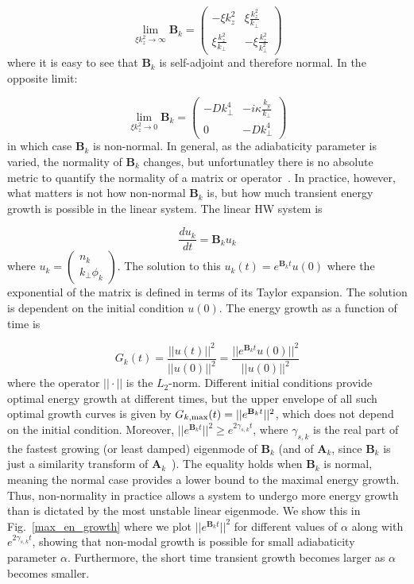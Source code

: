 \documentclass[letter,scriptaddress,twocolumn, prl,showkeys]{revtex4}
\def\beq{\begin{equation}}
\def\eeq{\end{equation}}
\newcommand{\diff}[2]{\frac{d#1}{d#2}}
\begin{document}
\beq
\label{B_norm_limit}
\displaystyle\lim_{\xi k_z^2 \to \infty} \mathbf{B}_k = \left( \begin{array}{cc} -\xi k_z^2 & \xi \frac{k_z^2}{k_\perp} \\  \xi \frac{k_z^2}{k_\perp} & - \xi \frac{k_z^2}{k_\perp^2} \end{array} \right)
\eeq
where it is easy to see that $\mathbf{B}_k$ is self-adjoint and therefore normal. In the opposite limit:

\beq
\label{B_norm_limit0}
\displaystyle\lim_{\xi k_z^2 \to 0} \mathbf{B}_k = \left( \begin{array}{cc} - D k_\perp^4 & -i \kappa \frac{k_y}{k_\perp} \\ 0  & - D k_\perp^4\end{array} \right)
\eeq
in which case $\mathbf{B}_k$ is non-normal. In general, as the adiabaticity parameter is varied, the normality of $\mathbf{B}_k$ changes, but unfortunatley there is no absolute metric to quantify
the normality of a matrix or operator~\cite{trefethen2005}. In practice, however, what matters is not how non-normal $\mathbf{B}_k$ is, but how much transient energy growth is possible in the linear
system. The linear HW system is

\beq
\label{lin_HW}
\diff{u_k}{t} = \mathbf{B}_k u_k
\eeq
where $u_k = \left( \begin{array}{cc} n_k \\ k_\perp \phi_k \end{array} \right)$. The solution to this $u_k(t) = e^{\mathbf{B}_k t} u(0)$ where the exponential of the matrix is defined in terms of
its Taylor expansion. The solution is dependent on the initial condition $u(0)$. The energy growth as a function of time is

\beq
\label{Gt}
G_k(t) = \frac{||u(t)||^2}{||u(0)||^2} = \frac{||e^{\mathbf{B}_k t} u(0)||^2}{||u(0)||^2}
\eeq
where the operator $|| \cdot ||$ is the $L_2$-norm. Different initial conditions provide optimal energy growth at different times, but the upper envelope of all such optimal growth curves is given by
$G_{k,\rm{max}}(t) = ||e^{\mathbf{B}_k t}||^2$, which does not depend on the initial condition.
Moreover, $||e^{\mathbf{B}_k t}||^2 \ge e^{2 \gamma_{s,k} t}$, where $\gamma_{s,k}$ is the real part of
the fastest growing (or least damped) eigenmode of $\mathbf{B}_k$ (and of $\mathbf{A}_k$, since $\mathbf{B}_k$ is just a similarity transform of $\mathbf{A}_k$~\cite{camargo1998}). 
The equality holds when $\mathbf{B}_k$ is normal, meaning the normal case provides a lower bound to the maximal energy growth. 
Thus, non-normality in practice allows a system to undergo more energy growth than is dictated by the most unstable linear eigenmode. We show this in Fig.~\ref{max_en_growth} where we plot
$||e^{\mathbf{B}_k t}||^2$ for different values of $\alpha$ along with $e^{2 \gamma_{s,k} t}$, showing that non-modal growth is possible for small adiabaticity parameter $\alpha$. Furthermore,
the short time transient growth becomes larger as $\alpha$ becomes smaller.
\end{document}
